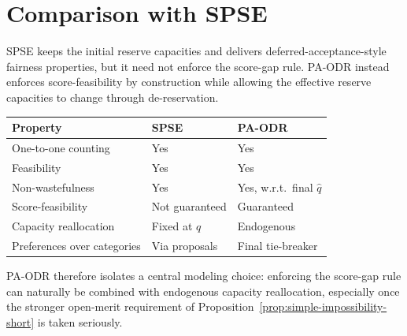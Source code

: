 \documentclass[10pt]{article}
\begin{document}
\section{Comparison with SPSE}

SPSE keeps the initial reserve capacities and delivers deferred-acceptance-style fairness properties, but it need not enforce the score-gap rule. PA-ODR instead enforces score-feasibility by construction while allowing the effective reserve capacities to change through de-reservation.

\begin{center}
\renewcommand{\arraystretch}{1.25}
\begin{tabular}{lll}
\toprule
\textbf{Property} & \textbf{SPSE} & \textbf{PA-ODR} \\
\midrule
One-to-one counting & Yes & Yes \\
Feasibility & Yes & Yes \\
Non-wastefulness & Yes & Yes, w.r.t.\ final $\hat q$ \\
Score-feasibility & Not guaranteed & Guaranteed \\
Capacity reallocation & Fixed at $q$ & Endogenous \\
Preferences over categories & Via proposals & Final tie-breaker \\
\bottomrule
\end{tabular}
\end{center}
PA-ODR therefore isolates a central modeling choice: enforcing the score-gap rule can naturally be combined with endogenous capacity reallocation, especially once the stronger open-merit requirement of Proposition~\ref{prop:simple-impossibility-short} is taken seriously.



\end{document}
